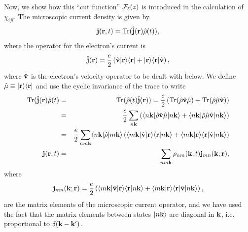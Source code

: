 \documentclass[floatfix,prb,aps,superscriptaddress,11pt,preprint]{revtex4}
\begin{document}
Now, we show how this ``cut function'' ${\mathbf{\cal F}}_\ell(z)$ is introduced in
the calculation of $\chi_{ijl}$.
The microscopic current density is given by
\begin{equation}\label{jmic}
\mathbf{j}(\mathbf{r},t)=\mathrm{Tr}(\hat{\mathbf{j}}(\mathbf{r})\hat\rho(t)),
\end{equation}
where the operator for the electron's current is
\begin{equation}\label{hatjmic}
\hat{\mathbf{j}}(\mathbf{r})=\frac{e}{2}\left(\hat{\mathbf{v}}| \mathbf{r} \rangle\langle \mathbf{r} |+| \mathbf{r} \rangle\langle \mathbf{r} |\hat{\mathbf{v}}\right),
\end{equation}
where $\hat{\mathbf{v}}$ is the electron's velocity operator to be dealt
with below. We define
$\hat\mu\equiv| \mathbf{r} \rangle\langle \mathbf{r} |$ and use the cyclic invariance of
the trace to write
\begin{eqnarray}\label{jmic2}
\mathrm{Tr}(\hat{\mathbf{j}}(\mathbf{r})\hat\rho(t)&=&\mathrm{Tr}(\hat\rho(t)\hat{\mathbf{j}}(\mathbf{r}))=
\frac{e}{2}
\left(
\mathrm{Tr}(\hat\rho\hat{\mathbf{v}}\hat\mu)
+
\mathrm{Tr}(\hat\rho\hat\mu\hat{\mathbf{v}})
\right)
\nonumber\\
&=&
\frac{e}{2}
\sum_{n\mathbf{k}}
\left(
\langle n\mathbf{k} |\hat\rho\hat{\mathbf{v}}\hat\mu| n\mathbf{k} \rangle
+
\langle n\mathbf{k} |\hat\rho\hat\mu\hat{\mathbf{v}}| n\mathbf{k} \rangle
\right)
\nonumber\\
&=&
\frac{e}{2}
\sum_{nm\mathbf{k}}
\langle n\mathbf{k} |\hat\rho| m\mathbf{k} \rangle
\left(
\langle m\mathbf{k} |\hat{\mathbf{v}}| \mathbf{r} \rangle\langle {\mathbf{r}} | {n\mathbf{k}} \rangle
+
\langle {m\mathbf{k}} | {\mathbf{r}} \rangle\langle \mathbf{r} |\hat{\mathbf{v}}| n\mathbf{k} \rangle
\right)
\nonumber\\
\mathbf{j}(\mathbf{r},t)&=&
\sum_{nm\mathbf{k}}
\rho_{nm}(\mathbf{k};t)\mathbf{j}_{mn}(\mathbf{k};\mathbf{r}),
\end{eqnarray}
where
\begin{equation}\label{jmic3}
\mathbf{j}_{mn}(\mathbf{k};\mathbf{r})=
\frac{e}{2}
\left(
\langle m\mathbf{k} |\hat{\mathbf{v}}| \mathbf{r} \rangle\langle {\mathbf{r}} | {n\mathbf{k}} \rangle
+
\langle {m\mathbf{k}} | {\mathbf{r}} \rangle\langle \mathbf{r} |\hat{\mathbf{v}}| n\mathbf{k} \rangle
\right),
\end{equation}
are the matrix elements of the microscopic current operator,
and we have used the fact that the matrix elements between states $| n\mathbf{k} \rangle$
are diagonal in $\mathbf{k}$, i.e. proportional to $\delta(\mathbf{k}-\mathbf{k}')$.
\end{document}
